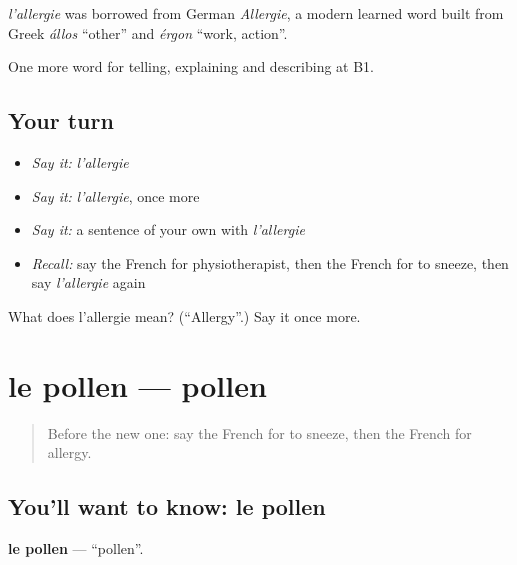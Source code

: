 \begin{cousinweb}
\emph{l'allergie} was borrowed from German \emph{Allergie}, a modern learned word built from Greek \emph{állos} \textquotedblleft{}other\textquotedblright{} and \emph{érgon} \textquotedblleft{}work, action\textquotedblright{}.
\end{cousinweb}

\begin{grammarlens}[title={What you've built}]
One more word for telling, explaining and describing at B1.
\end{grammarlens}

\subsection*{Your turn}
\begin{itemize}
\raggedright
  \item \emph{Say it:} \emph{l'allergie}
  \item \emph{Say it:} \emph{l'allergie}, once more
  \item \emph{Say it:} a sentence of your own with \emph{l'allergie}
  \item \emph{Recall:} say the French for physiotherapist, then the French for to sneeze, then say \emph{l'allergie} again
\end{itemize}

\begin{tcolorbox}[breakable,colback=teal!4,colframe=teal!35!black,title={Before you move on}]
What does l'allergie mean? (\textquotedblleft{}Allergy\textquotedblright{}.) Say it once more.
\end{tcolorbox}
\section[le pollen]{le pollen — pollen}

\label{lesson:FR-C482-pollen}



\begin{quote}
Before the new one: say the French for to sneeze, then the French for allergy.
\end{quote}

\subsection*{You'll want to know: le pollen}
\textbf{le pollen} — \textquotedblleft{}pollen\textquotedblright{}.

